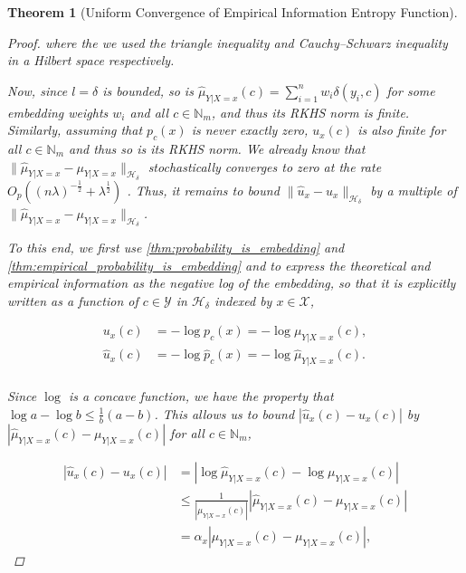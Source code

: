 \documentclass{article}
\newtheorem{theorem}{Theorem}[section]
\begin{document}
\begin{theorem}[Uniform Convergence of Empirical Information Entropy Function]
\begin{proof}
			where the we used the triangle inequality and Cauchy–Schwarz inequality in a Hilbert space respectively.
			
			Now, since $l = \delta$ is bounded, so is $\hat{\mu}_{Y | X = x}(c) = \sum_{i = 1}^{n} w_{i} \delta(y_{i}, c)$ for some embedding weights $w_{i}$ and all $c \in \mathbb{N}_{m}$, and thus its RKHS norm is finite. Similarly, assuming that $p_{c}(x)$ is never exactly zero, $u_{x}(c)$ is also finite for all $c \in \mathbb{N}_{m}$ and thus so is its RKHS norm. We already know that $\| \hat{\mu}_{Y | X = x} - \mu_{Y | X = x} \|_{\mathcal{H}_{\delta}}$ stochastically converges to zero at the rate $O_{p}((n \lambda)^{-\frac{1}{2}} + \lambda^{\frac{1}{2}})$ \citep{song2009hilbert}. Thus, it remains to bound $\| \hat{u}_{x} - u_{x} \|_{\mathcal{H}_{\delta}}$ by a multiple of $\| \hat{\mu}_{Y | X = x} - \mu_{Y | X = x} \|_{\mathcal{H}_{\delta}}$.
			
			To this end, we first use \cref{thm:probability_is_embedding} and \cref{thm:empirical_probability_is_embedding} and to express the theoretical and empirical information as the negative log of the embedding, so that it is explicitly written as a function of $c \in \mathcal{Y}$ in $\mathcal{H}_{\delta}$ indexed by $x \in \mathcal{X}$,
			
			\begin{equation}
			\begin{aligned}
				u_{x}(c) &= - \log{p_{c}(x)} = -\log{\mu_{Y | X = x}(c)}, \\
				\hat{u}_{x}(c) &= - \log{\hat{p}_{c}(x)} = -\log{\hat{\mu}_{Y | X = x}(c)}. \\
			\end{aligned}
			\end{equation}
			
			Since $\log$ is a concave function, we have the property that $\log{a} - \log{b} \leq \frac{1}{b} (a - b)$. This allows us to bound $| \hat{u}_{x}(c) - u_{x}(c) |$ by $| \hat{\mu}_{Y | X = x}(c) - \mu_{Y | X = x}(c) |$ for all $c \in \mathbb{N}_{m}$,
			
			\begin{equation}
			\begin{aligned}
				| \hat{u}_{x}(c) - u_{x}(c) | &= | \log{\hat{\mu}_{Y | X = x}(c)} - \log{\mu_{Y | X = x}(c)} | \\
				&\leq \frac{1}{| \mu_{Y | X = x}(c) |} | \hat{\mu}_{Y | X = x}(c) - \mu_{Y | X = x}(c) | \\
				&= \alpha_{x} | \hat{\mu}_{Y | X = x}(c) - \mu_{Y | X = x}(c) |,
			\end{aligned}
			\end{equation}
			

\end{proof}
\end{theorem}
\end{document}
